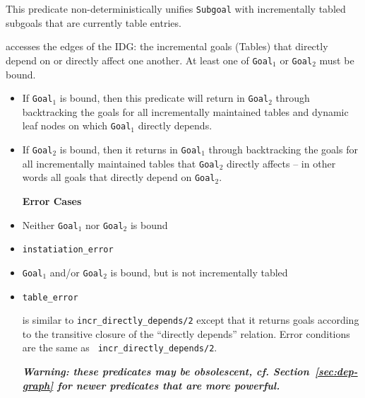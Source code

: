 \begin{description}

%
This predicate non-deterministically unifies {\tt Subgoal} with
incrementally tabled subgoals that are currently table entries.

accesses the edges of the IDG: the incremental goals (Tables) that
directly depend on or directly affect one another.  At least one of
{\tt Goal$_1$} or {\tt Goal$_2$} must be bound.
\begin{itemize}
\item If {\tt Goal$_1$} is bound, then this predicate will return in
  {\tt Goal$_2$} through backtracking the goals for all incrementally
  maintained tables and dynamic leaf nodes on which {\tt Goal$_1$}
  directly depends.
\item If {\tt Goal$_2$} is bound, then it returns in {\tt Goal$_1$}
  through backtracking the goals for all incrementally maintained
  tables that {\tt Goal$_2$} directly affects -- in other words all
  goals that directly depend on {\tt Goal$_2$}.  \ei

{\bf Error Cases}
\bi
\item Neither {\tt Goal$_1$} nor {\tt Goal$_2$} is bound 
\bi
\item 	{\tt instatiation\_error}
\ei
\item {\tt Goal$_1$} and/or {\tt Goal$_2$} is bound, but is not
  incrementally tabled
\bi
\item 	{\tt table\_error}
\ei
\ei

is similar to {\tt incr\_directly\_depends/2} except that it returns
goals according to the transitive closure of the ``directly depends''
relation.  Error conditions are the same as {\tt
  incr\_directly\_depends/2}.

%

{\bf {\em Warning: these predicates may be obsolescent, cf.
    Section~\ref{sec:dep-graph} for newer predicates that are more
    powerful.}}


\end{itemize}
\end{description}
